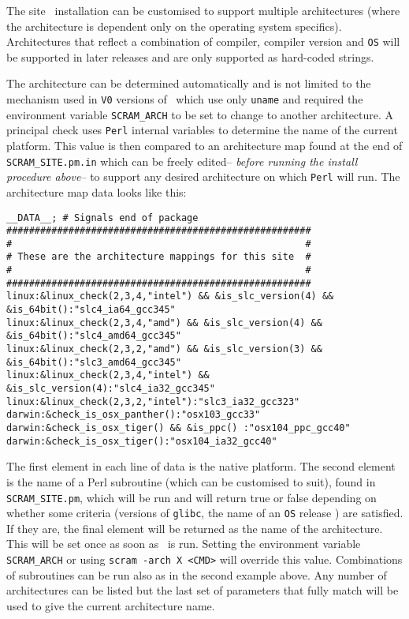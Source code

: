The site \scram\ installation can be customised to support multiple
architectures (where the architecture is dependent only on the
operating system specifics). Architectures that reflect a combination of
compiler, compiler version and \texttt{OS} will be supported in later
releases and are only supported as hard-coded strings.

\ni The architecture can be determined automatically and is not limited to
the mechanism used in \texttt{V0} versions of \scram\ which use only
\texttt{uname} and required the environment variable
\texttt{SCRAM\_ARCH} to be set to change to another architecture. 
A principal check uses \texttt{Perl} internal variables to
determine the name of the current platform. This value is then
compared to an architecture map found at the end of
\texttt{SCRAM\_SITE.pm.in} which can be freely edited-- \textit{before
running the install procedure above}-- to support any
desired architecture on which \texttt{Perl} will run. 
The architecture map data looks like this:
\begin{verbatim} 
__DATA__; # Signals end of package
######################################################
#                                                    #
# These are the architecture mappings for this site  #
#                                                    #
######################################################
linux:&linux_check(2,3,4,"intel") && &is_slc_version(4) && &is_64bit():"slc4_ia64_gcc345"
linux:&linux_check(2,3,4,"amd") && &is_slc_version(4) && &is_64bit():"slc4_amd64_gcc345"
linux:&linux_check(2,3,2,"amd") && &is_slc_version(3) && &is_64bit():"slc3_amd64_gcc345"
linux:&linux_check(2,3,4,"intel") && &is_slc_version(4):"slc4_ia32_gcc345"
linux:&linux_check(2,3,2,"intel"):"slc3_ia32_gcc323"
darwin:&check_is_osx_panther():"osx103_gcc33"
darwin:&check_is_osx_tiger() && &is_ppc() :"osx104_ppc_gcc40"
darwin:&check_is_osx_tiger():"osx104_ia32_gcc40"

\end{verbatim}

\ni The first element in each line of data is the native platform. The
second element is the name of a Perl subroutine (which can be
customised to suit), found in \texttt{SCRAM\_SITE.pm}, which will 
be run and will return true or false depending on whether some criteria (\eg versions of
\texttt{glibc}, the name of an \texttt{OS} release \etc) are satisfied. If they
are, the final element will be returned as the name of the
architecture. This will be set once as soon as \scram\ is run.
Setting the environment variable \texttt{SCRAM\_ARCH} or using
\texttt{scram -arch X <CMD>} will override this value.
Combinations of subroutines can be run also as in the second example above.
Any number of architectures can be listed but the last set
of parameters that fully match will be used to give the current
architecture name.

\newpage %


